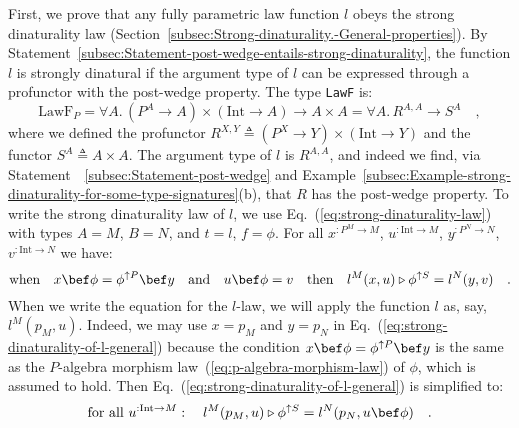 First, we prove that any fully parametric law function $l$ obeys
the strong dinaturality law (Section~\ref{subsec:Strong-dinaturality.-General-properties}).
By Statement~\ref{subsec:Statement-post-wedge-entails-strong-dinaturality},
the function $l$ is strongly dinatural if the argument type of $l$
can be expressed through a profunctor with the post-wedge property.
The type \lstinline!LawF!
is:
\[
\text{LawF}_{P}=\forall A.\,(P^{A}\rightarrow A)\times(\text{Int}\rightarrow A)\rightarrow A\times A=\forall A.\,R^{A,A}\rightarrow S^{A}\quad,
\]
where we defined the profunctor $R^{X,Y}\triangleq(P^{X}\rightarrow Y)\times(\text{Int}\rightarrow Y)$
and the functor $S^{A}\triangleq A\times A$. The argument type of
$l$ is $R^{A,A}$, and indeed we find, via Statement~~\ref{subsec:Statement-post-wedge}
and Example~\ref{subsec:Example-strong-dinaturality-for-some-type-signatures}(b),
that $R$ has the post-wedge property. To write the strong dinaturality
law of $l$, we use Eq.~(\ref{eq:strong-dinaturality-law}) with
types $A=M$, $B=N$, and $t=l$, $f=\phi$. For all $x^{:P^{M}\rightarrow M}$,
$u^{:\text{Int}\rightarrow M}$, $y^{:P^{N}\rightarrow N}$, $v^{:\text{Int}\rightarrow N}$
we have:
\begin{equation}
\text{when}\quad x\bef\phi=\phi^{\uparrow P}\bef y\quad\text{and}\quad u\bef\phi=v\quad\text{then}\quad l^{M}(x,u)\triangleright\phi^{\uparrow S}=l^{N}(y,v)\quad.\label{eq:strong-dinaturality-of-l-general}
\end{equation}
When we write the equation for the $l$-law, we will apply the function
$l$ as, say, $l^{M}(p_{M},u)$. Indeed, we may use $x=p_{M}$ and
$y=p_{N}$ in Eq.~(\ref{eq:strong-dinaturality-of-l-general}) because
the condition $x\bef\phi=\phi^{\uparrow P}\bef y$ is the same as
the $P$-algebra morphism law~(\ref{eq:p-algebra-morphism-law})
of $\phi$, which is assumed to hold. Then Eq.~(\ref{eq:strong-dinaturality-of-l-general})
is simplified to:
\begin{equation}
\text{for all }u^{:\text{Int}\rightarrow M}:\quad l^{M}(p_{M},u)\triangleright\phi^{\uparrow S}=l^{N}(p_{N},u\bef\phi)\quad.\label{eq:strong-dinaturality-of-typeclass-law-function-l}
\end{equation}

